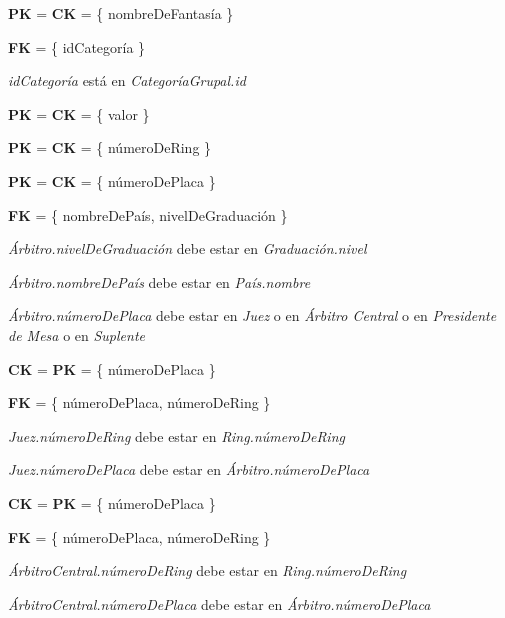 \textbf{PK} = \textbf{CK} = \{ nombreDeFantas\'ia \}

\textbf{FK} = \{ idCategor\'ia \}

\textit{idCategor\'ia} est\'a en \textit{Categor\'iaGrupal.id}\\


\textbf{PK} = \textbf{CK} = \{ valor \}\\


\textbf{PK} = \textbf{CK} = \{ númeroDeRing \}\\


\textbf{PK} = \textbf{CK} = \{ n\'umeroDePlaca \}

\textbf{FK} = \{ nombreDePaís, nivelDeGraduación \}

\textit{Árbitro.nivelDeGraduación} debe estar en \textit{Graduación.nivel}

\textit{Árbitro.nombreDePaís} debe estar en \textit{País.nombre}

\textit{Árbitro.númeroDePlaca} debe estar en \textit{Juez} o en \textit{Árbitro Central} o en \textit{Presidente de Mesa} o en \textit{Suplente}\\

 
\textbf{CK} = \textbf{PK} = \{ númeroDePlaca \}
 
\textbf{FK} = \{ númeroDePlaca, númeroDeRing \}

\textit{Juez.númeroDeRing} debe estar en \textit{Ring.númeroDeRing}

\textit{Juez.númeroDePlaca} debe estar en \textit{Árbitro.númeroDePlaca}\\


\textbf{CK} = \textbf{PK} = \{ númeroDePlaca \}
 
\textbf{FK} = \{ númeroDePlaca, númeroDeRing \}
 
\textit{ÁrbitroCentral.númeroDeRing} debe estar en \textit{Ring.númeroDeRing}

\textit{ÁrbitroCentral.númeroDePlaca} debe estar en \textit{Árbitro.númeroDePlaca}\\

